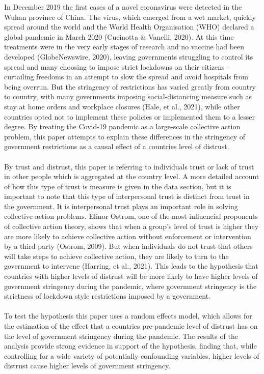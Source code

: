 \documentclass[
  11pt,
]{article}
\begin{document}
In December 2019 the first cases of a novel coronavirus were detected in the Wuhan province of China. The virus, which emerged from a wet market, quickly spread around the world and the World Health Organisation (WHO) declared a global pandemic in March 2020 (Cucinotta \& Vanelli, 2020). At this time treatments were in the very early stages of research and no vaccine had been developed (GlobeNewswire, 2020), leaving governments struggling to control its spread and many choosing to impose strict lockdowns on their citizens -- curtailing freedoms in an attempt to slow the spread and avoid hospitals from being overrun. But the stringency of restrictions has varied greatly from country to country, with many governments imposing social-distancing measure such as stay at home orders and workplace closures (Hale, et al., 2021), while other countries opted not to implement these policies or implemented them to a lesser degree. By treating the Covid-19 pandemic as a large-scale collective action problem, this paper attempts to explain these differences in the stringency of government restrictions as a causal effect of a countries level of distrust.\\
~\\
By trust and distrust, this paper is referring to individuals trust or lack of trust in other people which is aggregated at the country level. A more detailed account of how this type of trust is measure is given in the data section, but it is important to note that this type of interpersonal trust is distinct from trust in the government. It is interpersonal trust plays an important role in solving collective action problems. Elinor Ostrom, one of the most influencial proponents of collective action theory, shows that when a group's level of trust is higher they are more likely to achieve collective action without enforcement or intervention by a third party (Ostrom, 2009). But when individuals do not trust that others will take steps to achieve collective action, they are likely to turn to the government to intervene (Harring, et al., 2021). This leads to the hypothesis that countries with higher levels of distrust will be more likely to have higher levels of government stringency during the pandemic, where government stringency is the strictness of lockdown style restrictions imposed by a government.\\
~\\
To test the hypothesis this paper uses a random effects model, which allows for the estimation of the effect that a countries pre-pandemic level of distrust has on the level of government stringency during the pandemic. The results of the analysis provide strong evidence in support of the hypothesis, finding that, while controlling for a wide variety of potentially confounding variables, higher levels of distrust cause higher levels of government stringency.\\
\end{document}
